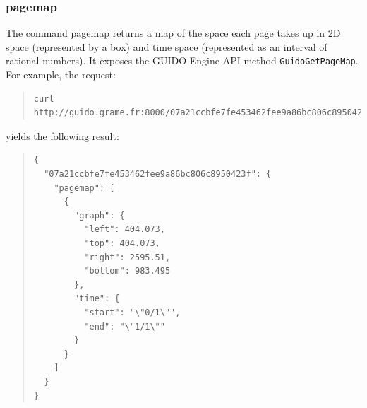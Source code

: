 \documentclass[a4paper]{article}
\begin{document}
\subsubsection{pagemap}
The command pagemap returns a map of the space each page takes up in 2D space (represented by a box) and time space (represented as an interval of rational numbers).  It exposes the GUIDO Engine API method \verb=GuidoGetPageMap=.  For example, the request:
\begin{quote}
\begingroup
\fontsize{7.5pt}{12pt}\selectfont
\begin{verbatim}
curl http://guido.grame.fr:8000/07a21ccbfe7fe453462fee9a86bc806c8950423f/pagemap
\end{verbatim}
\endgroup
\end{quote}
yields the following result:
\begin{quote}
\begin{verbatim}
{
  "07a21ccbfe7fe453462fee9a86bc806c8950423f": {
    "pagemap": [
      {
        "graph": {
          "left": 404.073,
          "top": 404.073,
          "right": 2595.51,
          "bottom": 983.495
        },
        "time": {
          "start": "\"0/1\"",
          "end": "\"1/1\""
        }
      }
    ]
  }
}
\end{verbatim}
\end{quote}
\end{document}
